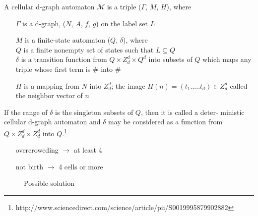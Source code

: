 \documentclass[10pt,a4paper,boxed]{hmcpset}
\begin{document}
\begin{problem}[Assignment 20]
\end{problem}
\begin{solution}
A cellular d-graph automaton $\mathcal{M}$ is a triple ($\Gamma$, $M$, $H$), where
    \begin{itemize} 
        \item[$\Gamma$] is a d-graph, ($N$, $A$, $f$, $g$) on the label set $L$
        \item[$M$] is a finite-state automaton ($Q$, $\delta$), where \\
                    $Q$ is a finite nonempty set of states such that $L \subseteq Q$\\
                    $\delta$ is a transition function from $Q \times Z^d_d \times Q^d$ into subsets of $Q$ which maps any triple whose first term is \# into {\#}
        \item[$H$] is a mapping from $N$ into $Z^d_d$; the image $H(n)=(t_1.....t_d) \in Z^d_d$ called the neighbor vector of $n$
    \end{itemize}
If the range of $\delta$ is the singleton subsets of $Q$, then it is called a deter- ministic cellular d-graph automaton and $\delta$ may be considered as a function from $Q × Z^d_d × Z^d_d$ into $Q$.\footnote{http://www.sciencedirect.com/science/article/pii/S0019995879902882}
\end{solution}


\begin{problem}[Assignment 22]
\end{problem}
\begin{solution}

\centering
   \begin{itemize}
     \item[] overcroweding $\rightarrow$ at least 4
     \item[] not birth $\rightarrow$ 4 cells or more
   \end{itemize}
   
\begin{figure}[h]
\centering
    \caption{Possible solution}
\end{figure}  

\end{solution}


\begin{problem}[Assignment 23]
\end{problem}
\begin{solution}

\end{solution}
\end{document}
